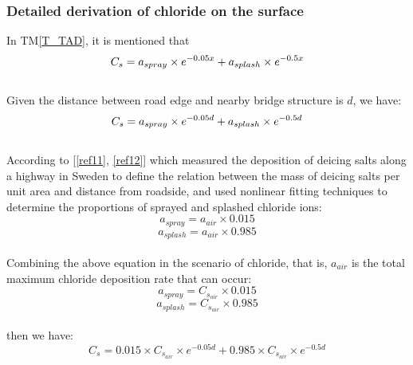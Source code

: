\documentclass[12pt]{article}
\newcommand{\tref}[1]{TM\ref{#1}}
\newcommand{\reref}[1]{\ref{#1}}
\begin{document}
\subsubsection*{Detailed derivation of chloride on the surface}
In \tref{T_TAD}, it is mentioned that
\[
C_s = a_{spray} \times e^{-0.05x} + a_{splash} \times e^{-0.5x}\\ 
\]
\\
Given the distance between road edge and nearby bridge structure is $d$, we have: 
\[
C_s = a_{spray} \times e^{-0.05d} + a_{splash} \times e^{-0.5d}\\ 
\]
\\
According to [\reref{ref11}, \reref{ref12}] which measured the deposition of deicing salts along a highway in Sweden to define the relation between the mass of deicing salts per unit area and distance from roadside, and used nonlinear fitting techniques to determine the proportions of sprayed and splashed chloride ions:
\[
a_{spray} = a_{air} \times 0.015
\]
\[
a_{splash} = a_{air} \times 0.985
\]
\\
Combining the above equation in the scenario of chloride, that is, $a_{air}$ is the total maximum chloride deposition rate that can occur:
\[
a_{spray} = C_{s_{air}} \times 0.015
\]
\[
a_{splash} = C_{s_{air}} \times 0.985
\]
\\
then we have:
\[
C_s = 0.015 \times C_{s_{air}} \times e^{-0.05d} + 0.985 \times C_{s_{air}} \times  e^{-0.5d}
\]


~\newline
\end{document}
